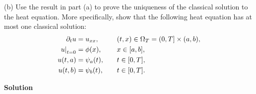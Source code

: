 \documentclass{article}
\begin{document}
\vspace{5mm}

(b) Use the result in part (a) to prove the uniqueness of the classical
solution to the heat equation. More specifically, show that the
following heat equation has at most one classical solution:
%
\begin{alignat*}{2}
    \partial_t u &= u_{x x}, &&\quad (t, x) \in \Omega_T = (0, T] \times (a, b), \\
    \eval[0]{u}_{t = 0} &= \phi(x), &&\quad x \in [a, b], \\
    u(t, a) &= \psi_a(t), &&\quad t \in [0, T], \\
    u(t, b) &= \psi_b(t), &&\quad t \in [0, T].
\end{alignat*}

\textbf{Solution}
\end{document}
